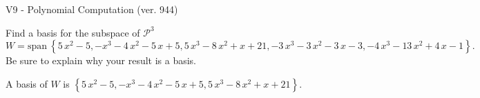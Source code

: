\begin{exercise}
  \begin{exerciseTitle}V9 - Polynomial Computation (ver. 944)\end{exerciseTitle}
  \begin{exerciseStatement}
    Find a basis for the subspace of \(\mathcal{P}^3\) 
\[W=\mathrm{span}\ \left\{5 \, x^{2} - 5 , -x^{3} - 4 \, x^{2} - 5 \, x + 5 , 5 \, x^{3} - 8 \, x^{2} + x + 21 , -3 \, x^{3} - 3 \, x^{2} - 3 \, x - 3 , -4 \, x^{3} - 13 \, x^{2} + 4 \, x - 1\right\}.\]
 Be sure to explain why your result is a basis.


  \end{exerciseStatement}
  \begin{exerciseAnswer}
   A basis of \(W\) is  \(\left\{5 \, x^{2} - 5 , -x^{3} - 4 \, x^{2} - 5 \, x + 5 , 5 \, x^{3} - 8 \, x^{2} + x + 21\right\}\).
  


  \end{exerciseAnswer}
\end{exercise}